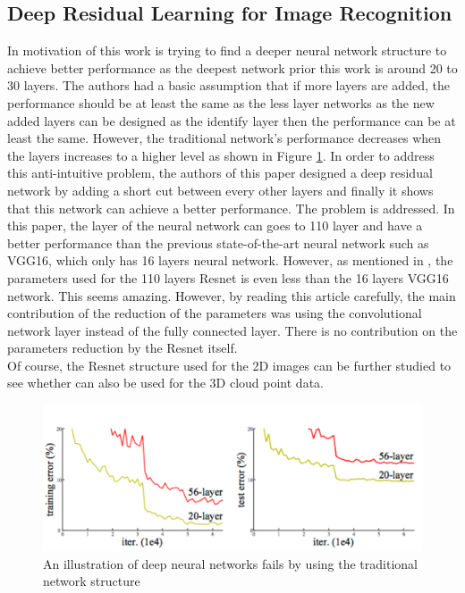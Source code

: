 \documentclass[a4paper,12pt]{article}
\begin{document}
\subsection{Deep Residual Learning for Image Recognition\cite{DBLP:journals/corr/HeZRS15}}
In motivation of this work is trying to find a deeper neural network structure to achieve better performance as the deepest network prior this work is around 20 to 30 layers. The authors had a basic assumption that if more layers are added, the performance should be at least the same as the less layer networks as the new added layers can be designed as the identify layer then the performance can be at least the same. However, the traditional network's performance decreases when the layers increases to a higher level as shown in Figure \ref{fig:resnet}. In order to address this anti-intuitive problem, the authors of this paper designed a deep residual network by adding a short cut between every other layers and finally it shows that this network can achieve a better performance. The problem is addressed. In this paper, the layer of the neural network can goes to 110 layer and have a better performance than the previous state-of-the-art neural network such as VGG16\cite{SimonyanZ14a}, which only has 16 layers neural network. However, as mentioned in \cite{DBLP:journals/corr/HeZRS15}, the parameters used for the 110 layers Resnet is even less than the 16 layers VGG16 network. This seems amazing. However, by reading this article carefully, the main contribution of the reduction of the parameters was using the convolutional network layer instead of the fully connected layer. There is no contribution on the parameters reduction by the Resnet itself.\\

Of course, the Resnet structure used for the 2D images can be further studied to see whether can also be used for the 3D cloud point data.\\ 
\begin{figure}[H]
  \begin{center}
      \includegraphics[scale=0.5]{renet1.png}
\end{center}
\caption{An illustration of deep neural networks fails by using the traditional network structure}
 \label{fig:resnet}
 \end{figure}

               


  
 
\end{document}
